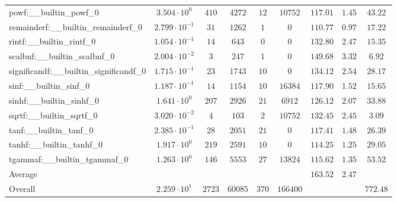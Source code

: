 \begin{tabular}{|l|c|c|c|c|c|c|c|c|}
powf:\_\_builtin\_powf\_0                 & $ 3.504 \cdot 10^{0}  $ & $ 410    $ & $ 4272  $ & $ 12  $ & $ 10752  $ & $ 117.01      $ & $ 1.45    $ & $ 43.22   $ \\
remainderf:\_\_builtin\_remainderf\_0     & $ 2.799 \cdot 10^{-1} $ & $ 31     $ & $ 1262  $ & $ 1   $ & $ 0      $ & $ 110.77      $ & $ 0.97    $ & $ 17.22   $ \\
rintf:\_\_builtin\_rintf\_0               & $ 1.054 \cdot 10^{-1} $ & $ 14     $ & $ 643   $ & $ 0   $ & $ 0      $ & $ 132.80      $ & $ 2.47    $ & $ 15.35   $ \\
scalbnf:\_\_builtin\_scalbnf\_0           & $ 2.004 \cdot 10^{-2} $ & $ 3      $ & $ 247   $ & $ 1   $ & $ 0      $ & $ 149.68      $ & $ 3.32    $ & $ 6.92    $ \\
significandf:\_\_builtin\_significandf\_0 & $ 1.715 \cdot 10^{-1} $ & $ 23     $ & $ 1743  $ & $ 10  $ & $ 0      $ & $ 134.12      $ & $ 2.54    $ & $ 28.17   $ \\
sinf:\_\_builtin\_sinf\_0                 & $ 1.187 \cdot 10^{-1} $ & $ 14     $ & $ 1154  $ & $ 10  $ & $ 16384  $ & $ 117.90      $ & $ 1.52    $ & $ 15.65   $ \\
sinhf:\_\_builtin\_sinhf\_0               & $ 1.641 \cdot 10^{0}  $ & $ 207    $ & $ 2926  $ & $ 21  $ & $ 6912   $ & $ 126.12      $ & $ 2.07    $ & $ 33.88   $ \\
sqrtf:\_\_builtin\_sqrtf\_0               & $ 3.020 \cdot 10^{-2} $ & $ 4      $ & $ 103   $ & $ 2   $ & $ 10752  $ & $ 132.45      $ & $ 2.45    $ & $ 3.09    $ \\
tanf:\_\_builtin\_tanf\_0                 & $ 2.385 \cdot 10^{-1} $ & $ 28     $ & $ 2051  $ & $ 21  $ & $ 0      $ & $ 117.41      $ & $ 1.48    $ & $ 26.39   $ \\
tanhf:\_\_builtin\_tanhf\_0               & $ 1.917 \cdot 10^{0}  $ & $ 219    $ & $ 2591  $ & $ 10  $ & $ 0      $ & $ 114.25      $ & $ 1.25    $ & $ 29.05   $ \\
tgammaf:\_\_builtin\_tgammaf\_0           & $ 1.263 \cdot 10^{0}  $ & $ 146    $ & $ 5553  $ & $ 27  $ & $ 13824  $ & $ 115.62      $ & $ 1.35    $ & $ 53.52   $ \\
\hline
Average                                   & $                     $ & $        $ & $       $ & $     $ & $        $ & $ 163.52      $ & $ 2.47    $ & $         $ \\
\hline
Overall                                   & $ 2.259 \cdot 10^{1}  $ & $ 2723   $ & $ 60085 $ & $ 370 $ & $ 166400 $ & $             $ & $         $ & $ 772.48  $ \\
\hline
\end{tabular}
